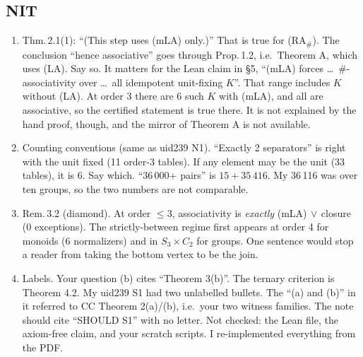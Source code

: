 \documentclass[11pt]{article}
\begin{document}
\subsection*{NIT}
\begin{enumerate}[label=\textbf{N\arabic*.},leftmargin=*]
\item Thm.\,2.1(1): ``(This step uses (mLA) only.)'' That is true for (RA$_\#$). The conclusion
  ``hence associative'' goes through Prop.\,1.2, i.e.\ Theorem A, which uses (LA). Say so. It matters for the
  Lean claim in \S5, ``(mLA) forces \dots\ \#-associativity over \dots\ all idempotent unit-fixing $K$''. That range includes
  $K$ without (LA). At order 3 there are 6 such $K$ with (mLA), and all are associative, so the certified
  statement is true there. It is not explained by the hand proof, though, and the mirror of Theorem A
  is not available.
\item Counting conventions (same as uid239 N1). ``Exactly 2 separators'' is right with the unit fixed (11
  order-3 tables). If any element may be the unit (33 tables), it is 6. Say which. ``36\,000+ pairs'' is
  $15+35\,416$. My 36\,116 was over ten groups, so the two numbers are not comparable.
\item Rem.\,3.2 (diamond). At order ${\le}3$, associativity is \emph{exactly} (mLA)$\,\vee\,$closure (0 exceptions).
  The strictly-between regime first appears at order 4 for monoids (6 normalizers) and in $S_3\times C_2$ for
  groups. One sentence would stop a reader from taking the bottom vertex to be the join.
\item Labels. Your question (b) cites ``Theorem 3(b)''. The ternary criterion is Theorem 4.2. My
  uid239 S1 had two unlabelled bullets. The ``(a) and (b)'' in it referred to CC Theorem 2(a)/(b), i.e.\ your
  two witness families. The note should cite ``SHOULD S1'' with no letter. Not checked: the Lean file, the
  axiom-free claim, and your scratch scripts. I re-implemented everything from the PDF.
\end{enumerate}
\end{document}
